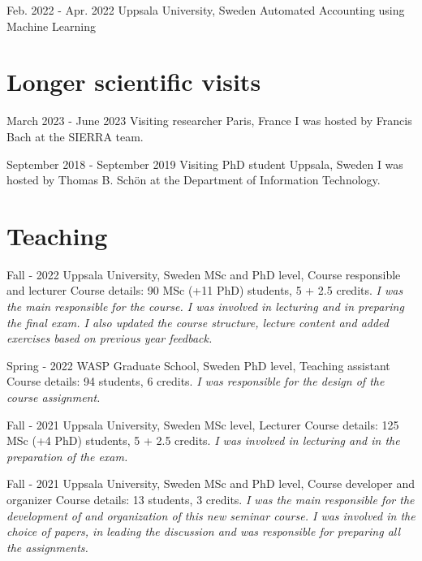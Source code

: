\documentclass[10pt,letterpaper]{article} %
\begin{document}
        { Feb. 2022 - Apr. 2022 }
        {  }
        { Uppsala University, Sweden }
        { { Automated Accounting using Machine Learning } }
        


\section*{Longer scientific visits}

    
        { March 2023 - June 2023 }
        { Visiting researcher }
        { Paris, France }
        { I was hosted by Francis Bach at the SIERRA team.}
    
        { September 2018 - September 2019 }
        { Visiting PhD student }
        { Uppsala, Sweden }
        { I was hosted by Thomas B. Schön at the Department of Information Technology.}
    

\section*{Teaching}


    {   Fall - 2022  }
    { Uppsala University, Sweden }
    { MSc and PhD level, Course responsible and lecturer }
    { Course details: 90 MSc (+11 PhD) students, 5 + 2.5 credits.  \emph{ I was the main responsible for the course. I was involved in lecturing and in preparing the final exam. I also updated the course structure, lecture content and added exercises based on previous year feedback. } }
    
    {   Spring - 2022  }
    { WASP Graduate School, Sweden }
    { PhD level, Teaching assistant }
    { Course details: 94 students, 6 credits.  \emph{ I was responsible for the design of the course assignment. } }
    
    {   Fall - 2021  }
    { Uppsala University, Sweden }
    { MSc level, Lecturer }
    { Course details: 125 MSc (+4 PhD) students, 5 + 2.5 credits.  \emph{ I was involved in lecturing and in the preparation of the exam. } }
    
    {   Fall - 2021  }
    { Uppsala University, Sweden }
    { MSc and PhD level, Course developer and organizer }
    { Course details: 13 students, 3 credits.  \emph{ I was the main responsible for the development of and organization of this new seminar course. I was involved in the choice of papers, in leading the discussion and was responsible for preparing all the assignments. } }
    
\end{document}
